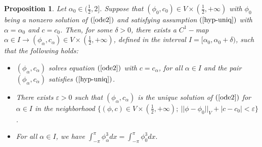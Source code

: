 \documentclass[12pt,reqno]{amsart}
\newcommand{\2}{L^2_{per}(0, T)}
\newtheorem{prop}{Proposition}[section]
\numberwithin{equation}{section}
\numberwithin{figure}{section}
\begin{document}
\begin{prop}\label{prop1-uniq}
	Let $\alpha_0\in(\frac{1}{2}, 2]$. Suppose that
	$(\phi_{0}, c_{0})\in V\times \left(\frac{1}{2},+\infty\right)$ with $\phi_0$ being a nonzero solution of $(\ref{ode2})$ and
	satisfying assumption $(\ref{hyp-uniq})$  with $\alpha=\alpha_0$ and $c=c_{0}$. Then, for some $\delta>0$, there exists a $C^1-$map
	$\alpha\in I\rightarrow (\phi_{\alpha}, c_{\alpha})\in V\times \left(\frac{1}{2},+\infty\right)$, defined in the interval $I=[\alpha_0, \alpha_0+\delta)$, such that the following
	holds:\\
	\begin{itemize}
		\item[(i)] $(\phi_{\alpha}, c_{\alpha})$ solves equation $(\ref{ode2})$ with $c=c_{\alpha}$, for all $\alpha\in I$ and the pair $(\phi_{\alpha}, c_{\alpha})$ satisfies $(\ref{hyp-uniq})$.
		\item[(ii)] There exists $\varepsilon>0$ such that $(\phi_{\alpha}, c_{\alpha})$ is the unique solution of $(\ref{ode2})$ for $\alpha\in I$ in
		the neighborhood $\{(\phi,c)\in V\times \left(\frac{1}{2},+\infty\right);\ ||\phi-\phi_{0}||_V+|c-c_{0}|<\varepsilon\}$.
		\item[(iii)] For all $\alpha\in I$, we have
		$\int_{-\pi}^{\pi}\phi_{\alpha}^3dx=\int_{-\pi}^{\pi}\phi_{0}^3dx.$
	\end{itemize}
\end{prop}
\end{document}
